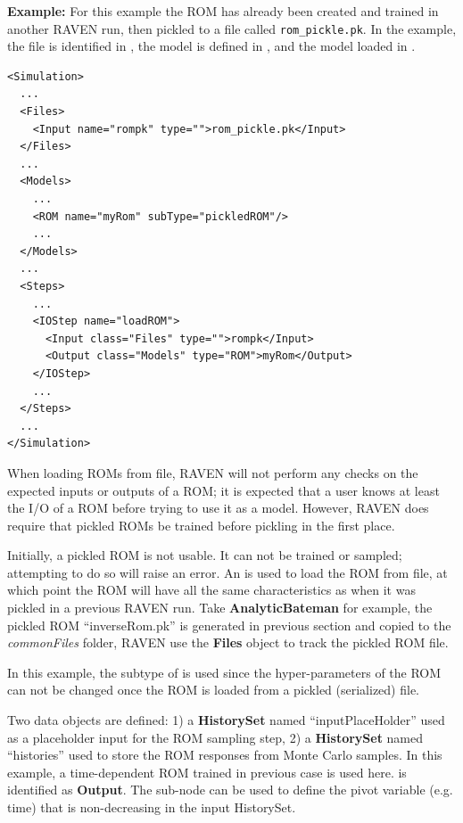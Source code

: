 \textbf{Example:}
For this example the ROM has already been created and trained in another RAVEN run, then pickled to a file
called \texttt{rom\_pickle.pk}.  In the example, the file is identified in , the model is
defined in , and the model loaded in .
{\footnotesize
\begin{lstlisting}[style=XML,morekeywords={name,subType}]
<Simulation>
  ...
  <Files>
    <Input name="rompk" type="">rom_pickle.pk</Input>
  </Files>
  ...
  <Models>
    ...
    <ROM name="myRom" subType="pickledROM"/>
    ...
  </Models>
  ...
  <Steps>
    ...
    <IOStep name="loadROM">
      <Input class="Files" type="">rompk</Input>
      <Output class="Models" type="ROM">myRom</Output>
    </IOStep>
    ...
  </Steps>
  ...
</Simulation>
\end{lstlisting}
}

\nb When loading ROMs from file, RAVEN will not perform any checks on the expected inputs or outputs of a ROM;
it is expected that a user knows at least the I/O of a ROM before trying to use it as a model. However, RAVEN
does require that pickled ROMs be trained before pickling in the first place.

Initially, a pickled ROM is not usable. It can not be trained or sampled; attempting to do so will raise an error.
An  is used to load the ROM from file, at which point the ROM will have all the same characteristics
as when it was pickled in a previous RAVEN run. Take \textbf{AnalyticBateman} for example, the pickled ROM
``inverseRom.pk'' is generated in previous section and copied to the \textit{commonFiles} folder, RAVEN use the
\textbf{Files} object to track the pickled ROM file.

In this example, the subtype  of  is used  since the hyper-parameters of the ROM can not be changed once the ROM is loaded from a pickled (serialized) file.

Two data objects are defined: 1) a \textbf{HistorySet} named ``inputPlaceHolder'' used as a placeholder input for
the ROM sampling step, 2) a \textbf{HistorySet} named ``histories'' used to store the ROM responses from Monte
Carlo samples. 
\nb In this example, a time-dependent ROM trained in previous case is used here.  is identified as
\textbf{Output}. The sub-node  can be used to define the pivot variable (e.g. time) that
is non-decreasing in the input HistorySet.

